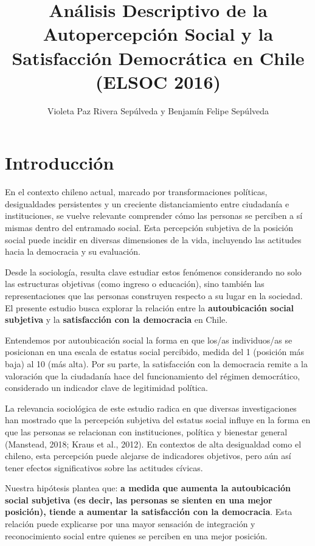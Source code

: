 \documentclass[
  11pt,
]{article}
\title{Análisis Descriptivo de la Autopercepción Social y la
Satisfacción Democrática en Chile (ELSOC 2016)}
\author{Violeta Paz Rivera Sepúlveda y Benjamín Felipe Sepúlveda}
\date{}
\begin{document}
\maketitle
\ifdefined\Shaded\renewenvironment{Shaded}{\begin{tcolorbox}[frame hidden, breakable, boxrule=0pt, enhanced, interior hidden, sharp corners, borderline west={3pt}{0pt}{shadecolor}]}{\end{tcolorbox}}\fi

\hypertarget{introducciuxf3n}{%
\section{Introducción}\label{introducciuxf3n}}

En el contexto chileno actual, marcado por transformaciones políticas,
desigualdades persistentes y un creciente distanciamiento entre
ciudadanía e instituciones, se vuelve relevante comprender cómo las
personas se perciben a sí mismas dentro del entramado social. Esta
percepción subjetiva de la posición social puede incidir en diversas
dimensiones de la vida, incluyendo las actitudes hacia la democracia y
su evaluación.

Desde la sociología, resulta clave estudiar estos fenómenos considerando
no solo las estructuras objetivas (como ingreso o educación), sino
también las representaciones que las personas construyen respecto a su
lugar en la sociedad. El presente estudio busca explorar la relación
entre la \textbf{autoubicación social subjetiva} y la
\textbf{satisfacción con la democracia} en Chile.

Entendemos por autoubicación social la forma en que los/as individuos/as
se posicionan en una escala de estatus social percibido, medida del 1
(posición más baja) al 10 (más alta). Por su parte, la satisfacción con
la democracia remite a la valoración que la ciudadanía hace del
funcionamiento del régimen democrático, considerado un indicador clave
de legitimidad política.

La relevancia sociológica de este estudio radica en que diversas
investigaciones han mostrado que la percepción subjetiva del estatus
social influye en la forma en que las personas se relacionan con
instituciones, política y bienestar general (Manstead, 2018; Kraus et
al., 2012). En contextos de alta desigualdad como el chileno, esta
percepción puede alejarse de indicadores objetivos, pero aún así tener
efectos significativos sobre las actitudes cívicas.

Nuestra hipótesis plantea que: \textbf{a medida que aumenta la
autoubicación social subjetiva (es decir, las personas se sienten en una
mejor posición), tiende a aumentar la satisfacción con la democracia}.
Esta relación puede explicarse por una mayor sensación de integración y
reconocimiento social entre quienes se perciben en una mejor posición.
\end{document}
